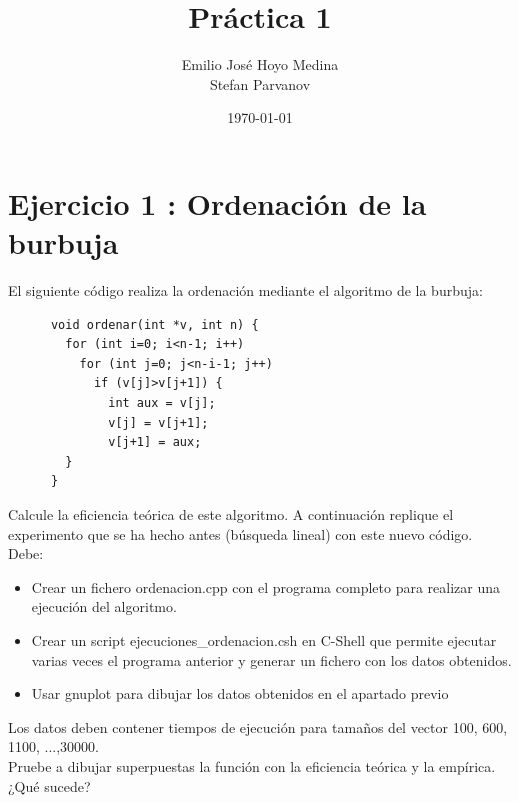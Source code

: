 \documentclass{article}
\begin{document}
\lstset{numbers=left}
      
\title{Práctica 1}
\author{Emilio José Hoyo Medina\\ Stefan Parvanov}
\date{\today}
\maketitle

\section{Ejercicio 1 : Ordenación de la burbuja}
El siguiente código realiza la ordenación mediante el algoritmo de la burbuja:
\begin{lstlisting}
      void ordenar(int *v, int n) {
        for (int i=0; i<n-1; i++)
          for (int j=0; j<n-i-1; j++)
            if (v[j]>v[j+1]) {
              int aux = v[j];
              v[j] = v[j+1];
              v[j+1] = aux;
		} 
      }
\end{lstlisting}

Calcule la eficiencia teórica de este algoritmo. A continuación replique el experimento que se ha hecho antes (búsqueda lineal) con este nuevo código. Debe:
\begin{itemize}
	\item Crear un fichero ordenacion.cpp con el programa completo para realizar una ejecución del algoritmo.
	\item Crear un script ejecuciones\_ordenacion.csh en C-Shell que permite ejecutar varias veces el programa anterior y generar un fichero con los datos obtenidos.
	\item Usar gnuplot para dibujar los datos obtenidos en el apartado previo
\end{itemize}
Los datos deben contener tiempos de ejecución para tamaños del vector 100, 600, 1100, ...,30000. \\
Pruebe a dibujar superpuestas la función con la eficiencia teórica y la empírica. ¿Qué sucede? 
\clearpage
\end{document}
